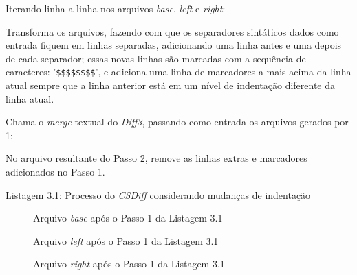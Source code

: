 \begin{center}
	\centering
	\begin{compactenum}[(1)]
		\item Iterando linha a linha nos arquivos \emph{base}, \emph{left} e \emph{right}:
		\begin{compactenum}
			\item Transforma os arquivos, fazendo com que os separadores
			sintáticos dados como entrada fiquem em linhas separadas,
			adicionando uma linha antes e uma depois de cada separador;
			essas novas linhas são marcadas com a sequência de
			caracteres: '\verb|$$$$$$$$|', e adiciona uma linha de
			marcadores a mais acima da linha atual sempre que a linha
			anterior está em um nível de indentação diferente da linha
			atual.
		\end{compactenum}
		\item Chama o \emph{merge} textual do \emph{Diff3}, passando como
		entrada os arquivos gerados por 1;
		\item No arquivo resultante do Passo 2, remove as linhas extras e
		marcadores adicionados no Passo 1.
	\end{compactenum}
	{Listagem 3.1: Processo do \emph{CSDiff} considerando mudanças de indentação}\\
	\label{csdiff_process_indentation}
\end{center}

\begin{figure}[ht]
	\begin{center}
		
		\caption{Arquivo \emph{base} após o Passo 1 da Listagem 3.1}\label{base_marcadores_indentacao}
	\end{center}
\end{figure}

\begin{figure}[ht]
	\begin{center}
		
		\caption{Arquivo \emph{left} após o Passo 1 da Listagem 3.1}\label{left_marcadores_indentacao}
	\end{center}
\end{figure}

\begin{figure}[ht]
	\begin{center}
		
		\caption{Arquivo \emph{right} após o Passo 1 da Listagem 3.1}\label{right_marcadores_indentacao}
	\end{center}
\end{figure}

